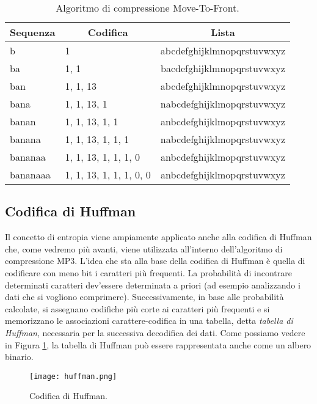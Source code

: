 			\begin{table}[h!]
				\centering
				\begin{tabular}{|l|l|c|}
					\multicolumn{1}{c}{\textbf{Sequenza}} & \multicolumn{1}{c}{\textbf{Codifica}} & \multicolumn{1}{c}{\textbf{Lista}}\\
					\hline
					b & 1 & abcdefghijklmnopqrstuvwxyz\\
					\hline
					ba & 1, 1 & bacdefghijklmnopqrstuvwxyz\\
					\hline
					ban & 1, 1, 13 & abcdefghijklmnopqrstuvwxyz\\
					\hline
					bana & 1, 1, 13, 1 & nabcdefghijklmopqrstuvwxyz\\
					\hline
					banan & 1, 1, 13, 1, 1 & anbcdefghijklmopqrstuvwxyz\\
					\hline
					banana & 1, 1, 13, 1, 1, 1 & nabcdefghijklmopqrstuvwxyz\\
					\hline
					bananaa & 1, 1, 13, 1, 1, 1, 0 & anbcdefghijklmopqrstuvwxyz\\
					\hline
					bananaaa & 1, 1, 13, 1, 1, 1, 0, 0 & anbcdefghijklmopqrstuvwxyz\\
					\hline
				\end{tabular}
				\caption{Algoritmo di compressione Move-To-Front.}
				\label{tab:move-to-front}
			\end{table}
		
		\subsection{Codifica di Huffman} \label{subsec:codifica_huffman}
			
			Il concetto di entropia viene ampiamente applicato anche alla codifica di Huffman che, come vedremo più avanti, viene utilizzata all'interno dell'algoritmo di compressione MP3. L'idea che sta alla base della codifica di Huffman è quella di codificare con meno bit i caratteri più frequenti. La probabilità di incontrare determinati caratteri dev'essere determinata a priori (ad esempio analizzando i dati che si vogliono comprimere). Successivamente, in base alle probabilità calcolate, si assegnano codifiche più corte ai caratteri più frequenti e si memorizzano le associazioni carattere-codifica in una tabella, detta \textit{tabella di Huffman}, necessaria per la successiva decodifica dei dati. Come possiamo vedere in Figura \ref{fig:huffman}, la tabella di Huffman può essere rappresentata anche come un albero binario.
			
			\begin{figure}[h!]
				\centering
					\texttt{[image: huffman.png]}
				\caption{Codifica di Huffman.}
				\label{fig:huffman}
			\end{figure}
		